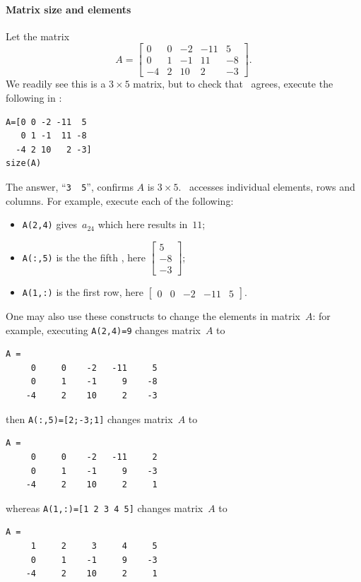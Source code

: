 \paragraph{Matrix size and elements}
Let the matrix
\begin{equation*}
A=\begin{bmatrix} 0 & 0 & -2 & -11 & 5\\ 0 & 1 & -1 & 11 & -8\\ -4 & 2 & 10 & 2 & -3 \end{bmatrix}.
\end{equation*}
We readily see this is a \(3\times5\) matrix, but to check that \script\ agrees, execute the following in \script: 
\begin{verbatim}
A=[0 0 -2 -11  5
   0 1 -1  11 -8
  -4 2 10   2 -3]
size(A)
\end{verbatim}
\setbox\ajrqrbox\hbox{}%
\marginpar{\usebox{\ajrqrbox\\[2ex]}}%
The answer, ``\verb|3  5|'', confirms \(A\) is \(3\times5\).
\script\ accesses individual elements, rows and columns.
For example, execute each of the following:
\begin{itemize}
\item \verb|A(2,4)| gives~\(a_{24}\) which here results in~\(11\);
\item \verb|A(:,5)| is the the fifth , here \(\begin{bmatrix} 5\\ -8\\ -3 \end{bmatrix}\);
\item \verb|A(1,:)| is the first row, here \(\begin{bmatrix} 0 & 0 & -2 & -11 & 5 \end{bmatrix}\).
\end{itemize}
One may also use these constructs to change the elements in matrix~\(A\): for example, executing
\verb|A(2,4)=9| changes matrix~\(A\) to
\begin{verbatim}
A =
     0     0    -2   -11     5
     0     1    -1     9    -8
    -4     2    10     2    -3
\end{verbatim}
then \verb|A(:,5)=[2;-3;1]| changes matrix~\(A\) to
\begin{verbatim}
A =
     0     0    -2   -11     2
     0     1    -1     9    -3
    -4     2    10     2     1
\end{verbatim}
whereas \verb|A(1,:)=[1 2 3 4 5]| changes matrix~\(A\) to
\begin{verbatim}
A =
     1     2     3     4     5
     0     1    -1     9    -3
    -4     2    10     2     1
\end{verbatim}


